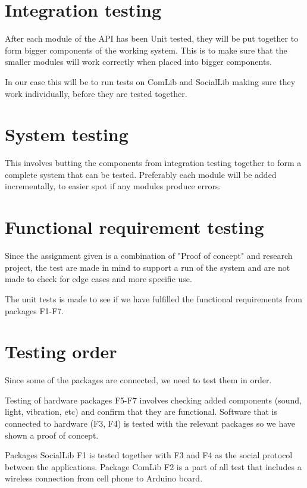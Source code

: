 \section{Integration testing}
After each module of the API has been Unit tested, they will be put together to form bigger components 
of the working system. This is to make sure that the smaller modules will work correctly when placed 
into bigger components. 

In our case this will be to run tests on ComLib and SocialLib making sure they work individually, 
before they are tested together.

\section{System testing}
This involves butting the components from integration testing together to form a complete system that 
can be tested. Preferably each module will be added incrementally, to easier spot if any modules produce errors.

\section{Functional requirement testing}
Since the assignment given is a combination of "Proof of concept" and research project, the test are made in mind to support a run of the system and are not made to check for edge cases and more specific use.

The unit tests is made to see if we have fulfilled the functional requirements from packages F1-F7.

\section{Testing order}
Since some of the packages are connected, we need to test them in order.

Testing of hardware packages F5-F7 involves checking added components (sound, light, vibration, etc) and confirm that they are functional. Software that is connected to hardware (F3, F4) is tested with the relevant packages so we have shown a proof of concept.

Packages SocialLib F1 is tested together with F3 and F4 as the social protocol between the applications. Package ComLib F2 is a part of all test that includes a wireless connection from cell phone to Arduino board.

